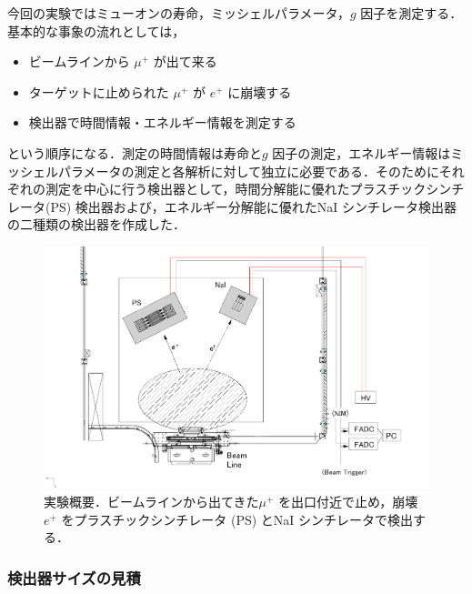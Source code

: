 今回の実験ではミューオンの寿命，ミッシェルパラメータ，$g$ 因子を測定する．基本的な事象の流れとしては，
\begin{itemize}
\item ビームラインから $\mu ^{+}$ が出て来る
\item ターゲットに止められた $\mu ^{+}$ が $e^{+}$ に崩壊する
\item 検出器で時間情報・エネルギー情報を測定する
\end{itemize}
という順序になる．測定の時間情報は寿命と$g$ 因子の測定，エネルギー情報はミッシェルパラメータの測定と各解析に対して独立に必要である．そのためにそれぞれの測定を中心に行う検出器として，時間分解能に優れたプラスチックシンチレータ(PS) 検出器および，エネルギー分解能に優れたNaI シンチレータ検出器の二種類の検出器を作成した．    
\begin{figure}[H]
\centering
\includegraphics[width=1\textwidth]{figure/hayakawa/lifetime.png}
\caption{実験概要．ビームラインから出てきた$\mu^{+}$ を出口付近で止め，崩壊$e^{+}$ をプラスチックシンチレータ (PS) とNaI シンチレータで検出する．}
\end{figure}

\subsubsection{検出器サイズの見積}

